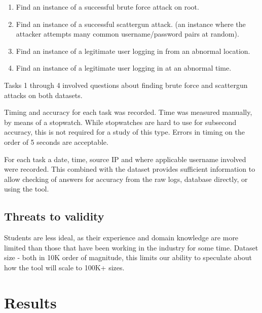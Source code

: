 \begin{enumerate}
\item{Find an instance of a successful brute force attack on root.}
\item{Find an instance of a successful scattergun attack.
(an instance where the attacker attempts many common username/password pairs at random).}
\item{Find an instance of a legitimate user logging in from an abnormal location.}
\item{Find an instance of a legitimate user logging in at an abnormal time.}
\end{enumerate}

Tasks 1 through 4 involved questions about finding brute force and scattergun attacks on both datasets.

Timing and accuracy for each task was recorded. 
Time was measured manually, by means of a stopwatch. While stopwatches are hard to use for subsecond accuracy, this is not required for a study of this type. Errors in timing on the order of 5 seconds are acceptable.

For each task a date, time, source IP and where applicable username involved were recorded. This combined with the dataset provides sufficient information to allow checking of answers for accuracy from the raw logs, database directly, or using the tool. 

\subsection{Threats to validity}
 Students are less ideal, as their experience and domain knowledge are more limited than those that have been working in the industry for some time.
Dataset size - both in 10K order of magnitude, this limits our ability to speculate about how the tool will scale to 100K+ sizes. 

\section{Results}


